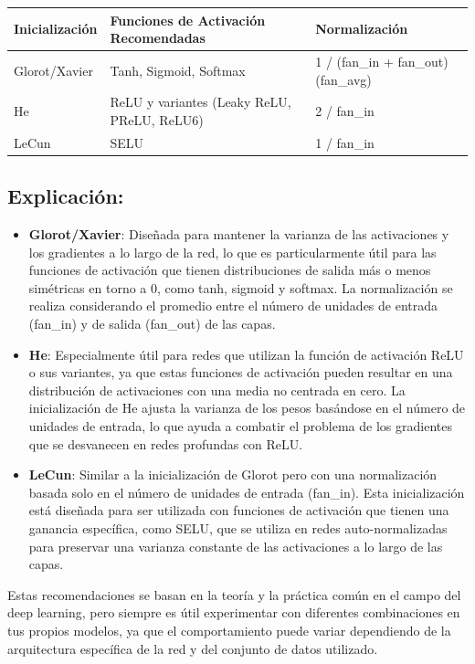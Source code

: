 \documentclass[11pt]{article}
\begin{document}
\begin{center}
\begin{tabular}{lll}
Inicialización & Funciones de Activación Recomendadas & Normalización\\[0pt]
\hline
Glorot/Xavier & Tanh, Sigmoid, Softmax & 1 / (fan\_in + fan\_out) (fan\_avg)\\[0pt]
He & ReLU y variantes (Leaky ReLU, PReLU, ReLU6) & 2 / fan\_in\\[0pt]
LeCun & SELU & 1 / fan\_in\\[0pt]
\end{tabular}
\end{center}

\subsection{Explicación:}
\label{sec:orge91376b}
\begin{itemize}
\item \textbf{Glorot/Xavier}: Diseñada para mantener la varianza de las
activaciones y los gradientes a lo largo de la red, lo que es
particularmente útil para las funciones de activación que tienen
distribuciones de salida más o menos simétricas en torno a 0, como
tanh, sigmoid y softmax. La normalización se realiza considerando el
promedio entre el número de unidades de entrada (fan\_in) y de salida
(fan\_out) de las capas.

\item \textbf{He}: Especialmente útil para redes que utilizan la función de
activación ReLU o sus variantes, ya que estas funciones de activación
pueden resultar en una distribución de activaciones con una media no
centrada en cero. La inicialización de He ajusta la varianza de los
pesos basándose en el número de unidades de entrada, lo que ayuda a
combatir el problema de los gradientes que se desvanecen en redes
profundas con ReLU.

\item \textbf{LeCun}: Similar a la inicialización de Glorot pero con una
normalización basada solo en el número de unidades de entrada
(fan\_in). Esta inicialización está diseñada para ser utilizada con
funciones de activación que tienen una ganancia específica, como SELU,
que se utiliza en redes auto-normalizadas para preservar una varianza
constante de las activaciones a lo largo de las capas.
\end{itemize}

Estas recomendaciones se basan en la teoría y la práctica común en el
campo del deep learning, pero siempre es útil experimentar con
diferentes combinaciones en tus propios modelos, ya que el
comportamiento puede variar dependiendo de la arquitectura específica de
la red y del conjunto de datos utilizado.
\end{document}
